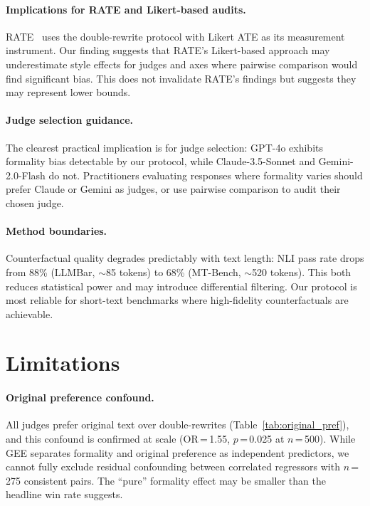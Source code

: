 \documentclass[11pt,a4paper]{article}
\begin{document}
\paragraph{Implications for RATE and Likert-based audits.}
RATE~\cite{ratebias2025} uses the double-rewrite protocol with Likert ATE as its measurement instrument.
Our finding suggests that RATE's Likert-based approach may underestimate style effects for judges and axes where pairwise comparison would find significant bias.
This does not invalidate RATE's findings but suggests they may represent lower bounds.

\paragraph{Judge selection guidance.}
The clearest practical implication is for judge selection: GPT-4o exhibits formality bias detectable by our protocol, while Claude-3.5-Sonnet and Gemini-2.0-Flash do not.
Practitioners evaluating responses where formality varies should prefer Claude or Gemini as judges, or use pairwise comparison to audit their chosen judge.

\paragraph{Method boundaries.}
Counterfactual quality degrades predictably with text length: NLI pass rate drops from 88\% (LLMBar, $\sim$85 tokens) to 68\% (MT-Bench, $\sim$520 tokens).
This both reduces statistical power and may introduce differential filtering.
Our protocol is most reliable for short-text benchmarks where high-fidelity counterfactuals are achievable.

\section{Limitations}

\paragraph{Original preference confound.}
All judges prefer original text over double-rewrites (Table~\ref{tab:original_pref}), and this confound is confirmed at scale (OR\,=\,1.55, $p$\,=\,0.025 at $n$\,=\,500).
While GEE separates formality and original preference as independent predictors, we cannot fully exclude residual confounding between correlated regressors with $n$\,=\,275 consistent pairs.
The ``pure'' formality effect may be smaller than the headline win rate suggests.
\end{document}
